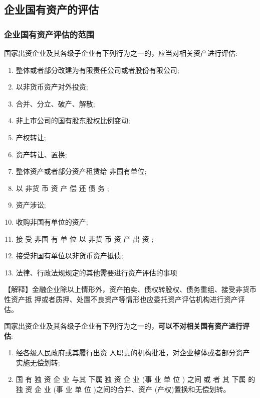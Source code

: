 \documentclass[UTF8,12pt]{ctexart}
\numberwithin{equation}{section} %
\numberwithin{figure}{section}
\numberwithin{table}{section}
\begin{document}
	
	
	\subsection{企业国有资产的评估}
	
	\subsubsection{企业国有资产评估的范围}
	
	国家出资企业及其各级子企业有下列行为之一的，应当对相关资产进行评估:
	\begin{enumerate}
		\item 整体或者部分改建为有限责任公司或者股份有限公司;
		
		\item 以非货币资产对外投资;
		
		\item 合并、分立、破产、解散;
		
		\item 非上市公司的国有股东股权比例变动;
		
		\item 产权转让;
		
		\item 资产转让、置换;
		
		\item 整体资产或者部分资产租赁给 非国有单位;
		
		\item 以 非货 币 资 产 偿 还 债 务 ;
		
		\item 资产涉讼;
		
		\item 收购非国有单位的资产;
		
		\item 接 受 非国 有 单 位 以 非货 币 资 产 出 资 ;
		
		\item 接受非国有单位以非货币资产抵债;
		
		\item 法律、行政法规规定的其他需要进行资产评估的事项
	\end{enumerate}
	【解释】金融企业除以上情形外，资产拍卖、债权转股权、债务重组、接受非货币性资产抵 押或者质押、处置不良资产等情形也应委托资产评估机构进行资产评估。
	
	国家出资企业及其各级子企业有下列行为之一的，\textbf{可以不对相关国有资产进行评估}:
	\begin{enumerate}
		\item 经各级人民政府或其履行出资 人职责的机构批准，对企业整体或者部分资产实施无偿划转;
		
		\item 国 有 独 资 企 业 与其 下属 独 资 企 业 (事 业 单 位 ) 之间 或 者 其 下属 的 独 资 企 业 (事 业 单 位 )之间的合并、资产 (产权)置换和无偿划转。
	\end{enumerate}
	
\end{document}

